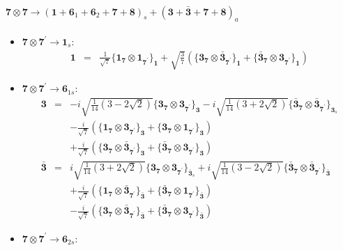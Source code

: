 \documentclass[english]{article}
\newcommand{\subcg}[3]{\big\{ {#1}\otimes{#2}\big\}^{}_{#3}}
\newcommand{\rep}[1]{\mathbf{#1}}
\begin{document}
\paragraph*{\Large $\rep{7}\otimes\rep{7}\to\left(\rep{1}+\rep{6}_{1}+\rep{6}_{2}+\rep{7}+\rep{8}\right)_s+\left(\rep{3}+\rep{\bar{3}}+\rep{7}+\rep{8}\right)_a$}
\begin{itemize}
\item $\rep{7}\otimes\rep{7^{\prime}}\to\rep{1}_{s}$:
\begin{eqnarray*}
\rep{1} &=& \frac{1}{\sqrt{7}}\subcg{\rep{1}_{\rep{7}}}{\rep{1}_{\rep{7^{\prime}}}}{\rep{1}}+\sqrt{\frac{3}{7}}\left(\subcg{\rep{3}_{\rep{7}}}{\rep{\bar{3}}_{\rep{7^{\prime}}}}{\rep{1}}+\subcg{\rep{\bar{3}}_{\rep{7}}}{\rep{3}_{\rep{7^{\prime}}}}{\rep{1}}\right)
\end{eqnarray*}
\item $\rep{7}\otimes\rep{7^{\prime}}\to\rep{6}_{1s}$:
\begin{eqnarray*}
\rep{3} &=& -i \sqrt{\frac{1}{14} \left(3-2 \sqrt{2}\right)}\subcg{\rep{3}_{\rep{7}}}{\rep{3}_{\rep{7^{\prime}}}}{\rep{3}}-i \sqrt{\frac{1}{14} \left(3+2 \sqrt{2}\right)}\subcg{\rep{\bar{3}}_{\rep{7}}}{\rep{\bar{3}}_{\rep{7^{\prime}}}}{\rep{3}_{s}} \\ 
 & & -\frac{i}{\sqrt{7}}\left(\subcg{\rep{1}_{\rep{7}}}{\rep{3}_{\rep{7^{\prime}}}}{\rep{3}}+\subcg{\rep{3}_{\rep{7}}}{\rep{1}_{\rep{7^{\prime}}}}{\rep{3}}\right) \\ 
 & & +\frac{i}{\sqrt{7}}\left(\subcg{\rep{3}_{\rep{7}}}{\rep{\bar{3}}_{\rep{7^{\prime}}}}{\rep{3}}+\subcg{\rep{\bar{3}}_{\rep{7}}}{\rep{3}_{\rep{7^{\prime}}}}{\rep{3}}\right)
\\
\rep{\bar{3}} &=& i \sqrt{\frac{1}{14} \left(3+2 \sqrt{2}\right)}\subcg{\rep{3}_{\rep{7}}}{\rep{3}_{\rep{7^{\prime}}}}{\rep{\bar{3}}_{s}}+i \sqrt{\frac{1}{14} \left(3-2 \sqrt{2}\right)}\subcg{\rep{\bar{3}}_{\rep{7}}}{\rep{\bar{3}}_{\rep{7^{\prime}}}}{\rep{\bar{3}}} \\ 
 & & +\frac{i}{\sqrt{7}}\left(\subcg{\rep{1}_{\rep{7}}}{\rep{\bar{3}}_{\rep{7^{\prime}}}}{\rep{\bar{3}}}+\subcg{\rep{\bar{3}}_{\rep{7}}}{\rep{1}_{\rep{7^{\prime}}}}{\rep{\bar{3}}}\right) \\ 
 & & -\frac{i}{\sqrt{7}}\left(\subcg{\rep{3}_{\rep{7}}}{\rep{\bar{3}}_{\rep{7^{\prime}}}}{\rep{\bar{3}}}+\subcg{\rep{\bar{3}}_{\rep{7}}}{\rep{3}_{\rep{7^{\prime}}}}{\rep{\bar{3}}}\right)
\end{eqnarray*}
\item $\rep{7}\otimes\rep{7^{\prime}}\to\rep{6}_{2s}$:
\begin{eqnarray*}

\end{eqnarray*}
\end{itemize}
\end{document}
